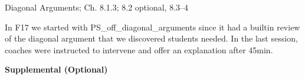 \documentclass[handout]{mcs}
\begin{document}


\begin{staffnotes}
Diagonal Arguments; Ch. 8.1.3; 8.2 optional, 8.3--4

In F17 we started with PS\_off\_diagonal\_arguments since it had a
builtin review of the diagonal argument that we discovered students
needed.  In the last session, coaches were instructed to intervene and
offer an explanation after 45min.
\end{staffnotes}





\begin{center}
\textbf{Supplemental (Optional)}
\end{center}











\end{document}
